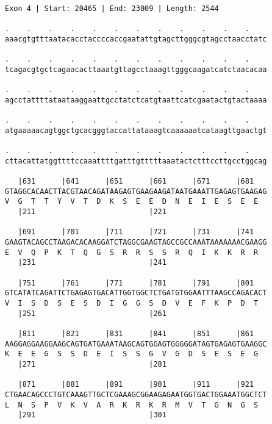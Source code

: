 \documentclass{article}
\begin{document}
\newpage
\begin{Verbatim}[fontfamily=courier]
Exon 4 | Start: 20465 | End: 23009 | Length: 2544

.    .    .    .    .    .    .    .    .    .    .    .    
aaacgtgtttaatacacctaccccaccgaatattgtagcttgggcgtagcctaacctatc

.    .    .    .    .    .    .    .    .    .    .    .    
tcagacgtgctcagaacacttaaatgttagcctaaagttgggcaagatcatctaacacaa

.    .    .    .    .    .    .    .    .    .    .    .    
agcctattttataataaggaattgcctatctcatgtaattcatcgaatactgtactaaaa

.    .    .    .    .    .    .    .    .    .    .    .    
atgaaaaacagtggctgcacgggtaccattataaagtcaaaaaatcataagttgaactgt

.    .    .    .    .    .    .    .    .    .    .    .    
cttacattatggttttccaaattttgatttgtttttaaatactctttccttgcctggcag

   |631      |641      |651      |661      |671      |681   
GTAGGCACAACTTACGTAACAGATAAGAGTGAAGAAGATAATGAAATTGAGAGTGAAGAG
V  G  T  T  Y  V  T  D  K  S  E  E  D  N  E  I  E  S  E  E  
   |211                          |221                       

   |691      |701      |711      |721      |731      |741   
GAAGTACAGCCTAAGACACAAGGATCTAGGCGAAGTAGCCGCCAAATAAAAAAACGAAGG
E  V  Q  P  K  T  Q  G  S  R  R  S  S  R  Q  I  K  K  R  R  
   |231                          |241                       

   |751      |761      |771      |781      |791      |801   
GTCATATCAGATTCTGAGAGTGACATTGGTGGCTCTGATGTGGAATTTAAGCCAGACACT
V  I  S  D  S  E  S  D  I  G  G  S  D  V  E  F  K  P  D  T  
   |251                          |261                       

   |811      |821      |831      |841      |851      |861   
AAGGAGGAAGGAAGCAGTGATGAAATAAGCAGTGGAGTGGGGGATAGTGAGAGTGAAGGC
K  E  E  G  S  S  D  E  I  S  S  G  V  G  D  S  E  S  E  G  
   |271                          |281                       

   |871      |881      |891      |901      |911      |921   
CTGAACAGCCCTGTCAAAGTTGCTCGAAAGCGGAAGAGAATGGTGACTGGAAATGGCTCT
L  N  S  P  V  K  V  A  R  K  R  K  R  M  V  T  G  N  G  S  
   |291                          |301                       

\end{Verbatim}
\newpage
\end{document}
